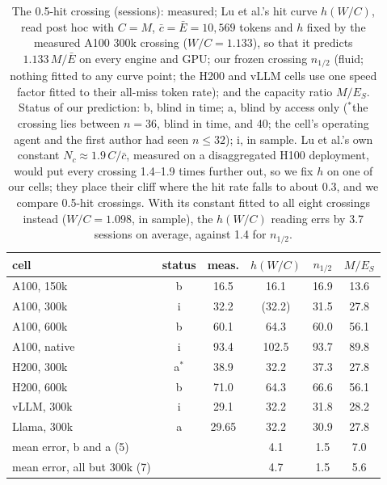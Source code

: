 \begin{table}[t]\centering\footnotesize
\caption{The 0.5-hit crossing (sessions): measured; Lu et al.'s hit curve $h(W/C)$, read post hoc with $C=M$,
$\bar c=\bar E=10{,}569$ tokens and $h$ fixed by the measured A100 300k crossing ($W/C=1.133$), so that it predicts
$1.133\,M/\bar E$ on every engine and GPU; our frozen crossing $n_{1/2}$ (fluid; nothing fitted to any curve point; the H200 and
vLLM cells use one speed factor fitted to their all-miss token rate); and the capacity ratio $M/E_S$. Status of our prediction:
b, blind in time; a, blind by access only ($^\ast$the crossing lies between $n=36$, blind in time, and 40; the cell's operating agent and the first
author had seen $n\le32$); i, in sample. Lu et al.'s own constant $N_c\approx1.9\,C/\bar c$, measured on a disaggregated H100 deployment,
would put every crossing 1.4--1.9 times further out, so we fix $h$ on one of our cells; they place their cliff where the hit rate
falls to about 0.3, and we compare 0.5-hit crossings. With its constant fitted to all eight
crossings instead ($W/C=1.098$, in sample), the $h(W/C)$ reading errs by 3.7 sessions on average, against 1.4 for
$n_{1/2}$.}\label{tab:lu}
\setlength{\tabcolsep}{3pt}
\begin{tabular}{@{}lccccc@{}}\toprule
cell & status & meas. & $h(W/C)$ & $n_{1/2}$ & $M/E_S$\\\midrule
A100, 150k & b & 16.5 & 16.1 & 16.9 & 13.6\\
A100, 300k & i & 32.2 & (32.2) & 31.5 & 27.8\\
A100, 600k & b & 60.1 & 64.3 & 60.0 & 56.1\\
A100, native & i & 93.4 & 102.5 & 93.7 & 89.8\\
H200, 300k & a$^\ast$ & 38.9 & 32.2 & 37.3 & 27.8\\
H200, 600k & b & 71.0 & 64.3 & 66.6 & 56.1\\
vLLM, 300k & i & 29.1 & 32.2 & 31.8 & 28.2\\
Llama, 300k & a & 29.65 & 32.2 & 30.9 & 27.8\\\midrule
mean error, b and a (5) & & & 4.1 & 1.5 & 7.0\\
mean error, all but 300k (7) & & & 4.7 & 1.5 & 5.6\\\bottomrule
\end{tabular}
\end{table}

